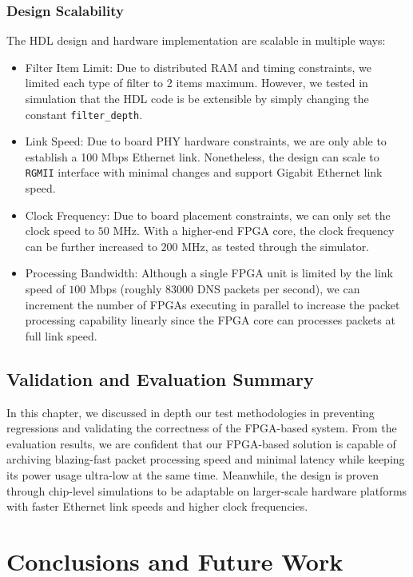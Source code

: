 \documentclass[a4paper]{report}
\newcommand{\code}{\texttt}
\begin{document}
\subsection{Design Scalability}

The HDL design and hardware implementation are scalable in multiple ways:

\begin{itemize}
    \item Filter Item Limit: Due to distributed RAM and timing constraints, we limited each type of filter to 2 items maximum. However, we tested in simulation that the HDL code is be extensible by simply changing the constant \code{filter\_depth}.
    \item Link Speed: Due to board PHY hardware constraints, we are only able to establish a 100 Mbps Ethernet link. Nonetheless, the design can scale to \code{RGMII} interface with minimal changes and support Gigabit Ethernet link speed.
    \item Clock Frequency: Due to board placement constraints, we can only set the clock speed to $50$ MHz. With a higher-end FPGA core, the clock frequency can be further increased to $200$ MHz, as tested through the simulator.
    \item Processing Bandwidth: Although a single FPGA unit is limited by the link speed of $100$ Mbps (roughly $83000$ DNS packets per second), we can increment the number of FPGAs executing in parallel to increase the packet processing capability linearly since the FPGA core can processes packets at full link speed.
\end{itemize}

\section{Validation and Evaluation Summary}

In this chapter, we discussed in depth our test methodologies in preventing regressions and validating the correctness of the FPGA-based system. From the evaluation results, we are confident that our FPGA-based solution is capable of archiving blazing-fast packet processing speed and minimal latency while keeping its power usage ultra-low at the same time. Meanwhile, the design is proven through chip-level simulations to be adaptable on larger-scale hardware platforms with faster Ethernet link speeds and higher clock frequencies.

\chapter{Conclusions and Future Work}
\end{document}
